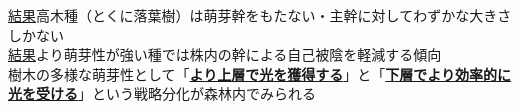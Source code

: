 \documentclass[a0, 30pt, plainboxedsections]{sciposter} %
\begin{document}
\begin{multicols}{2}
\begin{mdframed}[style=conclusion.frame,frametitle={\huge\textbf{\color{Black1}{
  \large\textbf{\faFlagAlt \vspace{0.02em} 結論: {萌芽性は最大樹高と相反して発達し、多様な受光体制の存在が樹種の共存に貢献している}}}}}]
  \vspace{0.4em}
  \normalsize{\underline{結果}高木種（とくに落葉樹）は萌芽幹をもたない・主幹に対してわずかな大きさしかない\\
  \underline{結果}より萌芽性が強い種では株内の幹による自己被陰を軽減する傾向\\
  }
  \large{\faHandLeft \vspace{0.02em} 樹木の多様な萌芽性として「\textbf{\underline{より上層で光を獲得する}}」と「\textbf{\underline{下層でより効率的に光を受ける}}」という戦略分化が森林内でみられる
  } %
\end{mdframed}
\end{multicols}
\begin{mdframed}[style=section.frame]
  \centering\huge\textbf{\color{white}{方法}}
\end{mdframed}
\end{document}
